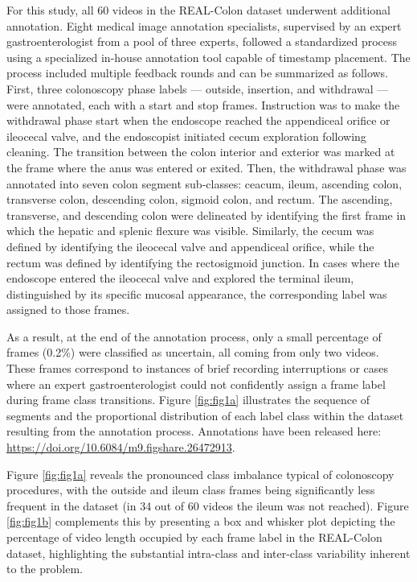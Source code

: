 For this study, all 60 videos in the REAL-Colon dataset underwent additional annotation. Eight medical image annotation specialists, supervised by an expert gastroenterologist from a pool of three experts, followed a standardized process using a specialized in-house annotation tool capable of timestamp placement. The process included multiple feedback rounds and can be summarized as follows. First, three colonoscopy phase labels — outside, insertion, and withdrawal — were annotated, each with a start and stop frames. Instruction was to make the withdrawal phase start when the endoscope reached the appendiceal orifice or ileocecal valve, and the endoscopist initiated cecum exploration following cleaning. The transition between the colon interior and exterior was marked at the frame where the anus was entered or exited. Then, the withdrawal phase was annotated into seven colon segment sub-classes: ceacum, ileum, ascending colon, transverse colon, descending colon, sigmoid colon, and rectum. The ascending, transverse, and descending colon were delineated by identifying the first frame in which the hepatic and splenic flexure was visible. Similarly, the cecum was defined by identifying the ileocecal valve and appendiceal orifice, while the rectum was defined by identifying the rectosigmoid junction. In cases where the endoscope entered the ileocecal valve and explored the terminal ileum, distinguished by its specific mucosal appearance, the corresponding label was assigned to those frames.

As a result, at the end of the annotation process, only a small percentage of frames (0.2\%) were classified as uncertain, all coming from only two videos. These frames correspond to instances of brief recording interruptions or cases where an expert gastroenterologist could not confidently assign a frame label during frame class transitions. Figure \ref{fig:fig1a} illustrates the sequence of segments and the proportional distribution of each label class within the dataset resulting from the annotation process. Annotations have been released here: \url{https://doi.org/10.6084/m9.figshare.26472913}. 

Figure \ref{fig:fig1a} reveals the pronounced class imbalance typical of colonoscopy procedures, with the outside and ileum class frames being significantly less frequent in the dataset (in 34 out of 60 videos the ileum was not reached). Figure \ref{fig:fig1b} complements this by presenting a box and whisker plot depicting the percentage of video length occupied by each frame label in the REAL-Colon dataset, highlighting the substantial intra-class and inter-class variability inherent to the problem.


